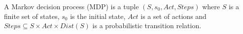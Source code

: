 \documentclass{llncs}
\begin{document}
A Markov decision process (MDP) is a tuple $(S, s_0, Act, Steps)$ where $S$ is a finite set of states,
$s_0$ is the initial state, $Act$ is a set of actions
and $Steps\subseteq S \times Act \times Dist(S)$ is a probabilistic transition relation.
\end{document}
